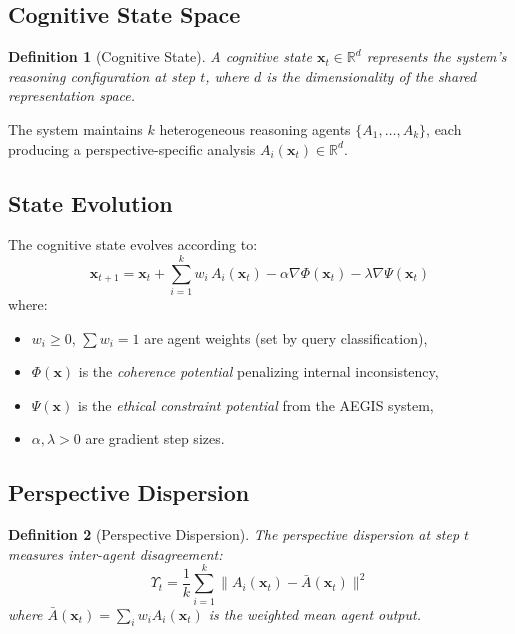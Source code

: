 \documentclass[11pt,a4paper]{article}
\newtheorem{definition}{Definition}
\begin{document}
\subsection{Cognitive State Space}

\begin{definition}[Cognitive State]
A cognitive state $\mathbf{x}_t \in \mathbb{R}^d$ represents the system's
reasoning configuration at step $t$, where $d$ is the dimensionality of the
shared representation space.
\end{definition}

The system maintains $k$ heterogeneous reasoning agents
$\{A_1, \ldots, A_k\}$, each producing a perspective-specific analysis
$A_i(\mathbf{x}_t) \in \mathbb{R}^d$.

\subsection{State Evolution}

The cognitive state evolves according to:
\begin{equation}
\label{eq:evolution}
\mathbf{x}_{t+1} = \mathbf{x}_t + \sum_{i=1}^{k} w_i \, A_i(\mathbf{x}_t)
  - \alpha \nabla\Phi(\mathbf{x}_t) - \lambda \nabla\Psi(\mathbf{x}_t)
\end{equation}
where:
\begin{itemize}[leftmargin=*,nosep]
  \item $w_i \geq 0$, $\sum w_i = 1$ are agent weights (set by query
    classification),
  \item $\Phi(\mathbf{x})$ is the \emph{coherence potential} penalizing
    internal inconsistency,
  \item $\Psi(\mathbf{x})$ is the \emph{ethical constraint potential} from
    the AEGIS system,
  \item $\alpha, \lambda > 0$ are gradient step sizes.
\end{itemize}

\subsection{Perspective Dispersion}

\begin{definition}[Perspective Dispersion]
The perspective dispersion at step $t$ measures inter-agent disagreement:
\begin{equation}
\label{eq:tension}
\Upsilon_t = \frac{1}{k} \sum_{i=1}^{k}
  \| A_i(\mathbf{x}_t) - \bar{A}(\mathbf{x}_t) \|^2
\end{equation}
where $\bar{A}(\mathbf{x}_t) = \sum_{i} w_i A_i(\mathbf{x}_t)$ is the
weighted mean agent output.
\end{definition}
\end{document}
